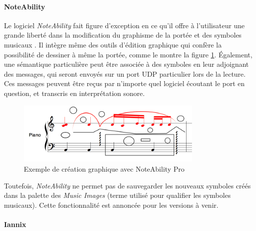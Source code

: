 \paragraph{NoteAbility} Le logiciel \textit{NoteAbility} fait figure d'exception en ce qu'il offre à l'utilisateur une grande liberté dans la modification du graphisme de la portée et des symboles musicaux \cite{noteAbility2018}.
Il intègre même des outils d'édition graphique qui confère la possibilité de dessiner à même la portée, comme le montre la figure \ref{fig:exempleNoteAbility}.
Également, une sémantique particulière peut être associée à des symboles en leur adjoignant des messages, qui seront envoyés sur un port UDP particulier lors de la lecture. Ces messages peuvent être reçus par n'importe quel logiciel écoutant le port en question, et transcris en interprétation sonore.

\begin{figure}[H]
	\centering
	\includegraphics[keepaspectratio=true, width=0.8\textwidth]{OutilsInformatiques/i/exempleNoteAbility.png}
	\caption{Exemple de création graphique avec NoteAbility Pro}
	\label{fig:exempleNoteAbility}			
\end{figure}

Toutefois, \textit{NoteAbility} ne permet pas de sauvegarder les nouveaux symboles créés dans la palette des \textit{Music Images} (terme utilisé pour qualifier les symboles musicaux). Cette fonctionnalité est annoncée pour les versions à venir.

\paragraph{Iannix}
 